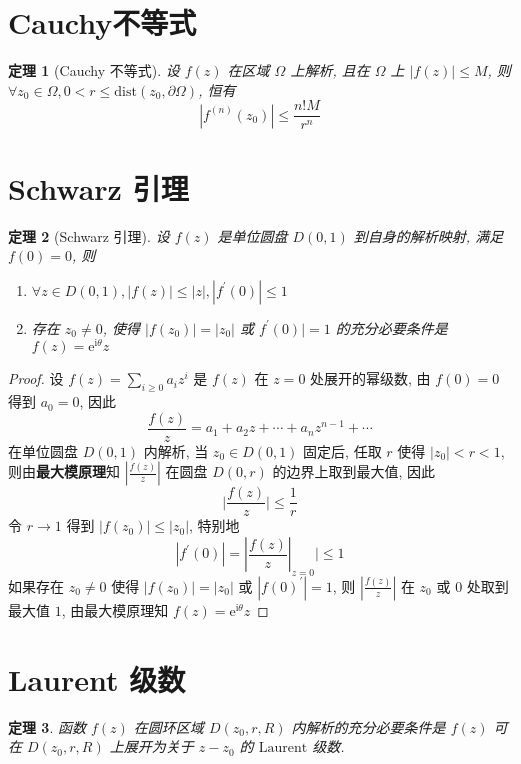 \documentclass[12pt,a4paper]{article}
\newtheorem{thm}{定理}[section]  %
\begin{document}
\section{Cauchy不等式}

\begin{thm}[Cauchy 不等式]
    设 $f(z)$ 在区域 $\Omega$ 上解析, 且在 $\Omega$ 上 $|f(z)| \leq M$, 则 $\forall z_0 \in \Omega, 0 < r \leq \mathrm{dist}(z_0, \partial \Omega)$, 恒有
    \[ |f^{(n)}(z_0)| \leq \frac{n!M}{r^n}\]
\end{thm}

\section{Schwarz 引理}

\begin{thm}[Schwarz 引理]
    设 $f(z)$ 是单位圆盘 $D(0,1)$ 到自身的解析映射, 满足 $f(0) = 0 $, 则
    \begin{enumerate}
        \item $\forall z \in D(0,1), |f(z)| \leq |z|, |f^{\prime}(0)| \leq 1$
        \item 存在 $z_0 \neq 0$, 使得 $|f(z_0)| = |z_0|$ 或 $f^{\prime}(0)| = 1$ 的充分必要条件是 $f(z) = \mathrm{e}^{\mathrm{i} \theta} z$
    \end{enumerate}
\end{thm}

\begin{proof}
    设 $f(z) = \sum\limits_{i \geq 0} a_i z^i$ 是 $f(z)$ 在 $z=0$ 处展开的幂级数, 由 $f(0) = 0$ 得到 $a_0 = 0$, 因此
    \[\frac{f(z)}{z} = a_1 + a_2 z + \cdots + a_n z^{n-1} + \cdots\]
    在单位圆盘 $D(0,1)$ 内解析, 当 $z_0 \in D(0,1)$ 固定后, 任取 $r$ 使得 $|z_0| < r < 1$, 则由\textbf{最大模原理}知 $|\frac{f(z)}{z}|$ 在圆盘 $D(0,r)$ 的边界上取到最大值, 因此
    \[ \mid \frac{f(z)}{z} \mid \leq \frac{1}{r}\]
    令 $r \to 1$ 得到 $|f(z_0)| \leq |z_0|$, 特别地
    \[|f^{\prime}(0)| = |\frac{f(z)}{z}|_{z=0} | \leq 1\]
    如果存在 $z_0 \neq 0$ 使得 $|f(z_0)| = |z_0|$ 或 $|f(0)^{\prime}| = 1$, 则 $|\frac{f(z)}{z}|$ 在 $z_0$ 或 $0$ 处取到最大值 $1$, 由最大模原理知 $f(z) = \mathrm{e}^{\mathrm{i}\theta} z$
\end{proof}

\section{Laurent 级数}

\begin{thm}
 函数 $f(z)$ 在圆环区域 $D(z_0, r, R)$ 内解析的充分必要条件是 $f(z)$ 可在 $D(z_0, r, R)$ 上展开为关于 $z-z_0$ 的 $\mathrm{Laurent}$ 级数.
\end{thm}
\end{document}
